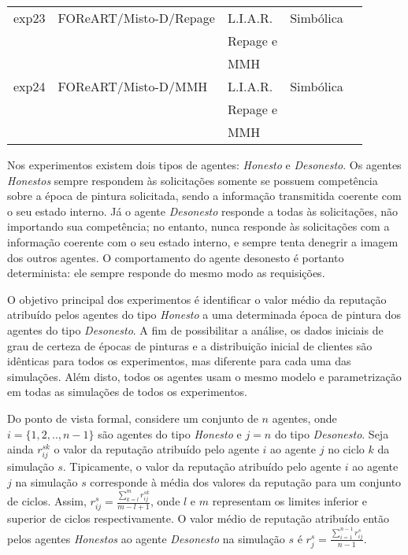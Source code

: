 \documentclass[]{article}
\begin{document}
\begin{table}[ht]
\begin{center}
\begin{tabular}{|l|l|l|l|l|}
			exp23  & FOReART/Misto-D/Repage & L.I.A.R.   & Simbólica\\
			       &                    & Repage e & \\
                   &                    & MMH   & \\
        \hline
			exp24  & FOReART/Misto-D/MMH & L.I.A.R.   & Simbólica\\
			       &                 & Repage e & \\
                   &                 & MMH   & \\
		\hline
	\end{tabular}
	\end{center}
\end{table}
%
Nos experimentos existem dois tipos de agentes: {\it Honesto} e {\it Desonesto}. Os agentes {\it Honestos} sempre respondem às solicitações somente se possuem competência sobre a época de pintura solicitada, sendo a informação transmitida coerente com o seu estado interno. Já o agente {\it Desonesto} responde a todas às solicitações, não importando sua competência; no entanto, nunca responde às solicitações com a informação coerente com o seu estado interno, e sempre tenta denegrir a imagem dos outros agentes. O comportamento do agente desonesto é portanto determinista: ele sempre responde do mesmo modo as requisições.

O objetivo principal dos experimentos é identificar o valor médio da reputação atribuído pelos agentes do tipo {\it Honesto} a uma determinada época de pintura dos agentes do tipo {\it Desonesto}. A fim de possibilitar a análise, os dados iniciais de grau de certeza de épocas de pinturas e a distribuição inicial de clientes são idênticas para todos os experimentos, mas diferente para cada uma das simulações. Além disto, todos os agentes usam o mesmo modelo e parametrização em todas as simulações de todos os experimentos.

Do ponto de vista formal, considere um conjunto de $n$ agentes, onde $i = \{1,2,..,n-1\}$ são agentes do tipo {\it Honesto} e $j = n$ do tipo {\it Desonesto}. Seja ainda $r_{ij}^{sk}$ o valor da reputação atribuído pelo agente $i$ ao agente $j$ no ciclo $k$ da simulação $s$. Tipicamente, o valor da reputação atribuído pelo agente $i$ ao agente $j$ na simulação $s$ corresponde à média dos valores da reputação para um conjunto de ciclos. Assim, $\displaystyle r_{ij}^{s} = \frac{\displaystyle \sum_{k=l}^{m} r_{ij}^{sk}}{m - l + 1}$, onde $l$ e $m$ representam os limites inferior e superior de ciclos respectivamente. O valor médio de reputação atribuído então pelos agentes {\it Honestos} ao agente {\it Desonesto} na simulação $s$ é $r_{j}^{s} = \frac{\displaystyle \sum_{i = 1}^{n -1} r_{ij}^{s}}{n - 1}$.
\end{document}
